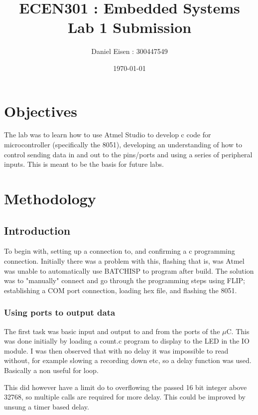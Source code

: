 \documentclass[11pt]{article}
\title{ECEN301 : Embedded Systems \\ Lab 1 Submission}
\author{Daniel Eisen : 300447549}
\date{\today}
\begin{document}
\begin{preview}
\maketitle
\section{Objectives}
The lab was to learn how to use Atmel Studio to develop c code for microcontroller (specifically the 8051), developing an understanding of how to control sending data in and out to the pins/ports and using a series of peripheral inputs. This is meant to be the basis for future labs.

\section{Methodology}
        \subsection{Introduction}
        To begin with, setting up a connection to, and confirming a c programming connection. Initially there was a problem with this, flashing that is, was Atmel was unable to automatically use BATCHISP to program after build. The solution was to "manually" connect and go through the programming steps using FLIP; establishing a COM port connection, loading hex file, and flashing the 8051. 

        \subsubsection{Using ports to output data}
        The first task was basic input and output to and from the ports of the $\mu$C. This was done initially by loading a count.c program to display to the LED in the IO module. I was then observed that with no delay it was impossible to read without, for example slowing a recording down etc, so a delay function was used. Basically a non useful for loop.
        
        This did however have a limit do to overflowing the passed 16 bit integer above 32768, so multiple calls are required for more delay. This could be improved by unsung a timer based delay.
        

\end{preview}
\end{document}

